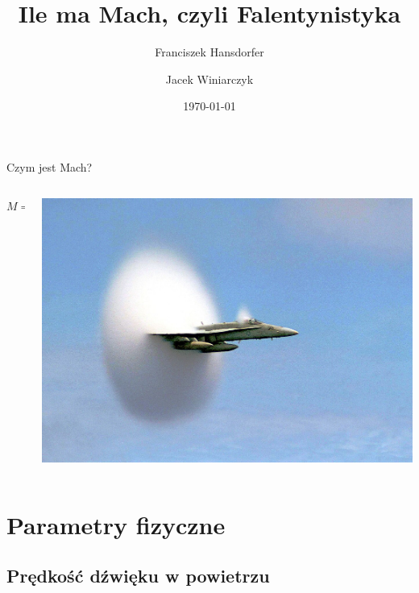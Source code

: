\documentclass{beamer}
\title{Ile ma Mach, czyli Falentynistyka}
\author{Franciszek Hansdorfer \and Jacek Winiarczyk}
\institute{Wydział fizyki doświadczalnej KFnrD}
\date{\today}
\begin{document}
\begin{frame}
	\titlepage
\end{frame}

\begin{frame}{Czym jest Mach?}
\begin{columns}

\begin{column}{0.3\linewidth}
$$M = \frac{v_{ob}}{c}$$
\end{column}

\begin{column}{0.7\linewidth}
	\includegraphics[width=\linewidth]{mach.jpg}
\end{column}

\end{columns}

\end{frame}

\section{Parametry fizyczne}

\subsection{Prędkość dźwięku w powietrzu}
\end{document}

